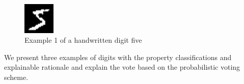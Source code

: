 \documentclass[conference]{IEEEtran}
\begin{document}

 \begin{figure}[htbp]
\centerline{\includegraphics[width=15mm]{./digit-images/5-0.png}}
\caption{Example 1 of a handwritten digit five}
\label{example1}
\end{figure}

We present three examples of digits with the property classifications and explainable rationale and explain the vote based on the probabilistic voting scheme.
\end{document}
